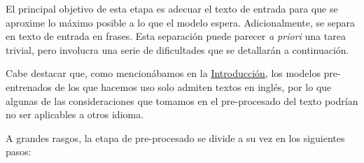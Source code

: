 El principal objetivo de esta etapa es adecuar el texto de entrada para que se aproxime lo máximo posible a lo que el modelo espera. Adicionalmente, se separa en texto de entrada en frases. Esta separación puede parecer \emph{a priori} una tarea trivial, pero involucra una serie de dificultades que se detallarán a continuación.

Cabe destacar que, como mencionábamos en la \hyperref[chapter:intro]{Introducción}, los modelos pre-entrenados de los que hacemos uso solo admiten textos en inglés, por lo que algunas de las consideraciones que tomamos en el pre-procesado del texto podrían no ser aplicables a otros idioma.

A grandes rasgos, la etapa de pre-procesado se divide a su vez en los siguientes pasos:

\vspace{-0.4cm}

